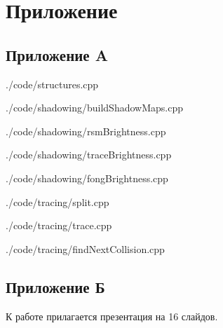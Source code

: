 \chapter{Приложение}

\section{Приложение A}

 {./code/structures.cpp}

 {./code/shadowing/buildShadowMaps.cpp}

 {./code/shadowing/rsmBrightness.cpp}
    
 {./code/shadowing/traceBrightness.cpp}

 {./code/shadowing/fongBrightness.cpp}

 {./code/tracing/split.cpp}

 {./code/tracing/trace.cpp}

 {./code/tracing/findNextCollision.cpp}

\section {Приложение Б}
К работе прилагается презентация на 16 слайдов.